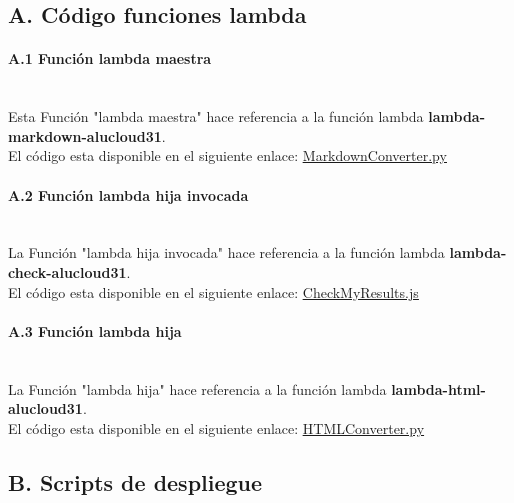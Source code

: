\documentclass[
]{article}
\begin{document}
\hypertarget{header-n213}{%
\subsection{A. Código funciones lambda}\label{header-n213}}



\hypertarget{header-n214}{%
\paragraph{A.1 Función lambda maestra}\label{header-n214}}
\leavevmode
\newline
\\
Esta Función "lambda maestra" hace referencia a la función lambda \textbf{lambda-markdown-alucloud31}.\\
El código esta disponible en el siguiente enlace:  \underline{\href{https://github.com/manujose94/FINAL-PROJECT-ICP/blob/main/parent-lambda-code/MarkdownConverter.py}{MarkdownConverter.py}}\\

\hypertarget{header-n216}{%
\paragraph{A.2 Función lambda hija invocada}\label{header-n216}}
\leavevmode
\newline
\\
La Función "lambda hija invocada" hace referencia a la función lambda \textbf{lambda-check-alucloud31}.\\
El código esta disponible en el siguiente enlace:  \underline{\href{https://github.com/manujose94/FINAL-PROJECT-ICP/blob/main/childnode-lambda-code/CheckMyResults.js}{CheckMyResults.js}}\\
\hypertarget{header-n218}{%
\paragraph{A.3 Función lambda hija}\label{header-n218}}
\leavevmode
\newline
\\
La Función "lambda hija" hace referencia a la función lambda \textbf{lambda-html-alucloud31}.\\
El código esta disponible en el siguiente enlace:  \underline{\href{https://github.com/manujose94/FINAL-PROJECT-ICP/blob/main/child-lambda-code/HTMLConverter.py}{HTMLConverter.py}}\\

\hypertarget{header-n220}{%
\subsection{B. Scripts de despliegue}\label{header-n220}}
\end{document}
